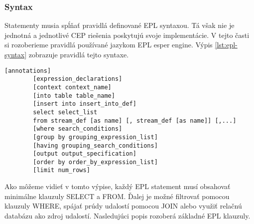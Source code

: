 		\subsubsection{Syntax}
		Statementy musia spĺňať pravidlá definované EPL syntaxou. Tá však nie je jednotná a jednotlivé CEP riešenia poskytujú svoje implementácie. V tejto časti si rozoberieme pravidlá používané jazykom EPL esper engine. Výpis \ref{lst:epl-syntax} zobrazuje pravidlá tejto syntaxe.
		
		\begin{lstlisting}[label=lst:epl-syntax,caption=Vzor EPL syntaxe]
		[annotations]
		[expression_declarations]
		[context context_name]
		[into table table_name]
		[insert into insert_into_def]
		select select_list
		from stream_def [as name] [, stream_def [as name]] [,...]
		[where search_conditions]
		[group by grouping_expression_list]
		[having grouping_search_conditions]
		[output output_specification]
		[order by order_by_expression_list]
		[limit num_rows]
		\end{lstlisting}

		Ako môžeme vidieť v tomto výpise, každý EPL statement musí obsahovať minimálne klauzuly SELECT a FROM. Ďalej je možné filtrovať pomocou klauzuly WHERE, spájať prúdy udalostí pomocou JOIN alebo využiť relačnú databázu ako zdroj udalostí. Nasledujúci popis rozoberá základné EPL klauzuly.
		
